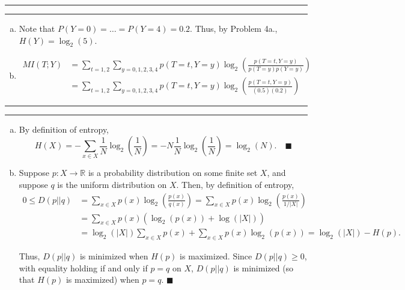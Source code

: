 \documentclass[11pt]{article}
\newcounter{questionCounter}
\newcounter{partCounter}[questionCounter]
\newenvironment{question}[2][\arabic{questionCounter}]{%
    \setcounter{partCounter}{0}%
    \vspace{.25in} \hrule \vspace{0.5em}%
        \noindent{\bf #2}%
    \vspace{0.8em} \hrule \vspace{.10in}%
    \addtocounter{questionCounter}{1}%
}{}
\renewcommand{\qed}{\quad $\blacksquare$}
\newcommand{\mqed}{\quad \blacksquare}
\newcommand{\R}{\mathbb{R}} %
\begin{document}
\newpage
\begin{question}{Problem 3}
\begin{enumerate}[a.]
\item Note that $P(Y = 0) = \dots = P(Y = 4) = 0.2$. Thus, by Problem 4a.,
$H(Y) = \log_2(5)$.

\item
\begin{align*}
MI(T;Y) 
 & = \sum_{t = 1,2} \sum_{y = 0,1,2,3,4} p(T = t,Y = y) \log_2 \left( \frac{p(T = t,Y = y)}{p(T = y)p(Y = y)} \right) \\
 & = \sum_{t = 1,2} \sum_{y = 0,1,2,3,4} p(T = t,Y = y) \log_2 \left( \frac{p(T = t,Y = y)}{(0.5)(0.2)} \right)
\end{align*}

\end{enumerate}
\end{question}

\begin{question}{Problem 4}
\begin{enumerate}[a.]
\item By definition of entropy,
\[H(X)
 = -\sum_{x \in X} \frac{1}{N} \log_2\left( \frac{1}{N} \right)
 = -N\frac{1}{N} \log_2\left( \frac{1}{N} \right)
 = \log_2(N). \mqed
\]

\item Suppose $p: X \rightarrow \R$ is a probability distribution on some
finite set $X$, and suppose $q$ is the uniform distribution on $X$.
Then, by definition of entropy,
\begin{align*}
0 \leq D(p || q)
 & = \sum_{x \in X} p(x) \log_2\left( \frac{p(x)}{q(x)} \right)
   = \sum_{x \in X} p(x) \log_2\left( \frac{p(x)}{1/|X|} \right)        \\
 & = \sum_{x \in X} p(x) \left( \log_2(p(x)) + \log(|X|) \right)        \\
 & = \log_2(|X|)\sum_{x \in X} p(x) + \sum_{x \in X} p(x) \log_2(p(x))
   = \log_2(|X|) - H(p).
\end{align*}

Thus, $D(p || q)$ is minimized when $H(p)$ is maximized.
Since $D(p || q) \geq 0$, with equality holding if and only if $p = q$ on
$X$, $D(p || q)$ is minimized (so that $H(p)$ is maximized) when $p = q$. \qed
\end{enumerate}
\end{question}
\end{document}
